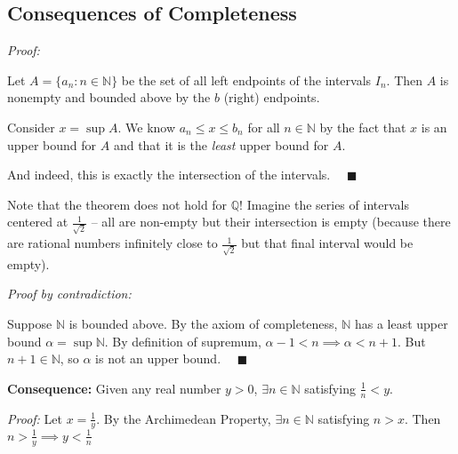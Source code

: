 \documentclass[12pt]{report}
\newcommand{\R}{\mathbb{R}}
\newcommand{\Q}{\mathbb{Q}}
\newcommand{\N}{\mathbb{N}}
\newcommand{\qed}{\quad \blacksquare}
\newenvironment*{tbox}[2][gray]{
    \begin{tcolorbox}[
        parbox=false,
        colback=#1!5!white,
        colframe=#1!75!black,
        breakable,
        title={#2}
    ]}
    {\end{tcolorbox}}
\begin{document}
    \subsection*{Consequences of Completeness}
        \begin{tbox}{\textbf{Theorem (Nested interval property):} For each $n \in \N$, assume we are given a closed interval $I_n = [a_n, b_n] = \{x \in \R: a_n \leq x \leq b_n\}$. Assume also that $I_n$ contains $I_{n+1}$. Then the resulting nested sequence $I_1 \supseteq I_2 \supseteq I_3 \supseteq \dots$ has a nonempty intersection $\bigcap_{n=1}^{\infty} I_n \neq \emptyset$}
            \emph{Proof:} 

            Let $A = \{a_n: n \in \N\}$ be the set of all left endpoints of the intervals $I_n$. Then $A$ is nonempty and bounded above by the $b$ (right) endpoints. 

            Consider $x = \sup A$. We know $a_n \leq x \leq b_n$ for all $n \in \N$ by the fact that $x$ is an upper bound for $A$ and that it is the \emph{least} upper bound for $A$.  

            And indeed, this is exactly the intersection of the intervals. $\qed$
        \end{tbox}

        Note that the theorem does not hold for $\Q$! Imagine the series of intervals centered at $\frac{1}{\sqrt{2}}$ -- all are non-empty but their intersection is empty (because there are rational numbers infinitely close to $\frac{1}{\sqrt{2}}$ but that final interval would be empty).

        \begin{tbox}{\textbf{Theorem (Archimedian Property):} Given any number $x \in \R$, $\exists n \in \N$ satisfying $n > x$. (i.e. $\N$ is \emph{not} bounded above)}
            \emph{Proof by contradiction:} 

            Suppose $\N$ is bounded above. By the axiom of completeness, $\N$ has a least upper bound $\alpha = \sup \N$. By definition of supremum, $\alpha - 1 < n \implies \alpha < n + 1$. But $n + 1 \in \N$, so $\alpha$ is not an upper bound. $\qed$
        \end{tbox}

        \textbf{Consequence:} Given any real number $y > 0$, $\exists n \in \N$ satisfying $\frac{1}{n} < y$.

        \emph{Proof:} Let $x = \frac{1}{y}$. By the Archimedean Property, $\exists n \in \N$ satisfying $n > x$. Then $n > \frac{1}{y} \implies y < \frac{1}{n}$
\end{document}
